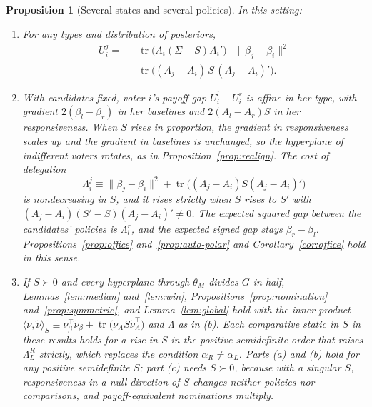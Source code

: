 \documentclass[12pt,letterpaper]{article}
\newtheorem{proposition}{Proposition}
\begin{document}
\begin{proposition}[Several states and several policies]\label{prop:multistate}
In this setting:
\begin{enumerate}
  \item[(a)] For any types and distribution of posteriors,
  \[
  \begin{aligned}
  U_i^j={}&-\operatorname{tr}\!\big(A_i(\Sigma-S)A_i'\big)-\|\beta_j-\beta_i\|^2\\
  &-\operatorname{tr}\!\big((A_j-A_i)\,S\,(A_j-A_i)'\big).
  \end{aligned}
  \]
  \item[(b)] With candidates fixed, voter $i$'s payoff gap $U_i^l-U_i^r$ is affine in her type, with gradient $2(\beta_l-\beta_r)$ in her baselines and $2(A_l-A_r)S$ in her responsiveness. When $S$ rises in proportion, the gradient in responsiveness scales up and the gradient in baselines is unchanged, so the hyperplane of indifferent voters rotates, as in Proposition~\ref{prop:realign}. The cost of delegation
  \[
  \Lambda_i^j\equiv\|\beta_j-\beta_i\|^2+\operatorname{tr}\big((A_j-A_i)S(A_j-A_i)'\big)
  \]
  is nondecreasing in $S$, and it rises strictly when $S$ rises to $S'$ with $(A_j-A_i)(S'-S)(A_j-A_i)'\ne0$. The expected squared gap between the candidates' policies is $\Lambda_l^r$, and the expected signed gap stays $\beta_r-\beta_l$. Propositions~\ref{prop:office} and~\ref{prop:auto-polar} and Corollary~\ref{cor:office} hold in this sense.
  \item[(c)] If $S\succ0$ and every hyperplane through $\theta_M$ divides $G$ in half, Lemmas~\ref{lem:median} and~\ref{lem:win}, Propositions~\ref{prop:nomination} and~\ref{prop:symmetric}, and Lemma~\ref{lem:global} hold with the inner product $\langle\nu,\tilde\nu\rangle_S\equiv\nu_\beta^\top\tilde\nu_\beta+\operatorname{tr}\big(\nu_A S\tilde\nu_A^\top\big)$ and $\Lambda$ as in (b). Each comparative static in $S$ in these results holds for a rise in $S$ in the positive semidefinite order that raises $\Lambda_L^R$ strictly, which replaces the condition $\alpha_R\ne\alpha_L$. Parts (a) and (b) hold for any positive semidefinite $S$; part (c) needs $S\succ0$, because with a singular $S$, responsiveness in a null direction of $S$ changes neither policies nor comparisons, and payoff-equivalent nominations multiply.
\end{enumerate}
\end{proposition}
\end{document}
